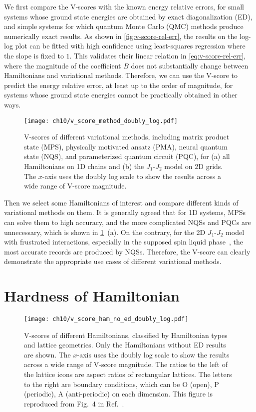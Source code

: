 We first compare the V-scores with the known energy relative errors, for small systems whose ground state energies are obtained by exact diagonalization (ED), and simple systems for which quantum Monte Carlo (QMC) methods produce numerically exact results. As shown in \cref{fig:v-score-rel-err}, the results on the log-log plot can be fitted with high confidence using least-squares regression where the slope is fixed to $1$. This validates their linear relation in \cref{eq:v-score-rel-err}, where the magnitude of the coefficient $B$ does not substantially change between Hamiltonians and variational methods. Therefore, we can use the V-score to predict the energy relative error, at least up to the order of magnitude, for systems whose ground state energies cannot be practically obtained in other ways.

\begin{figure}[htb]
\centering
\texttt{[image: ch10/v\_score\_method\_doubly\_log.pdf]}
\caption[V-scores of different variational methods]{
V-scores of different variational methods, including matrix product state (MPS), physically motivated ansatz (PMA), neural quantum state (NQS), and parameterized quantum circuit (PQC), for (a) all Hamiltonians on 1D chains and (b) the $J_1$-$J_2$ model on 2D grids.
The $x$-axis uses the doubly log scale to show the results across a wide range of V-score magnitude.
}
\label{fig:v-score-method}
\end{figure}

Then we select some Hamiltonians of interest and compare different kinds of variational methods on them. It is generally agreed that for 1D systems, MPSs can solve them to high accuracy, and the more complicated NQSs and PQCs are unnecessary, which is shown in \cref{fig:v-score-method}~(a). On the contrary, for the 2D $J_1$-$J_2$ model with frustrated interactions, especially in the supposed spin liquid phase~\cite{dagotto1989phase, schulz1996magnetic, hu2013direct, liang2018solving, liu2018gapless, choo2019two, nomura2021dirac}, the most accurate records are produced by NQSs. Therefore, the V-score can clearly demonstrate the appropriate use cases of different variational methods.

\section{Hardness of Hamiltonian}

\begin{figure}[htb]
\centering
\texttt{[image: ch10/v\_score\_ham\_no\_ed\_doubly\_log.pdf]}
\caption[V-scores of different Hamiltonians]{
V-scores of different Hamiltonians, classified by Hamiltonian types and lattice geometries.
Only the Hamiltonians without ED results are shown.
The $x$-axis uses the doubly log scale to show the results across a wide range of V-score magnitude.
The ratios to the left of the lattice icons are aspect ratios of rectangular lattices. The letters to the right are boundary conditions, which can be O (open), P (periodic), A (anti-periodic) on each dimension.
This figure is reproduced from Fig.~4 in Ref.~\cite{wu2024variational}.
}
\label{fig:v-score-ham}
\end{figure}

